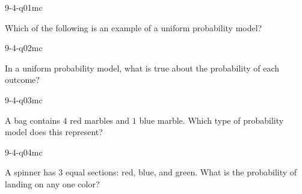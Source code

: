 

\begin{practiceQuestion}{9-4-q01}{mc}
\begin{questionText}
Which of the following is an example of a uniform probability model?
\end{questionText}
\end{practiceQuestion}

\begin{practiceQuestion}{9-4-q02}{mc}
\begin{questionText}
In a uniform probability model, what is true about the probability of each outcome?
\end{questionText}
\end{practiceQuestion}

\begin{practiceQuestion}{9-4-q03}{mc}
\begin{questionText}
A bag contains $4$ red marbles and $1$ blue marble. Which type of probability model does this represent?
\end{questionText}
\end{practiceQuestion}

\begin{practiceQuestion}{9-4-q04}{mc}
\begin{questionText}
A spinner has $3$ equal sections: red, blue, and green. What is the probability of landing on any one color?
\end{questionText}
\end{practiceQuestion}

